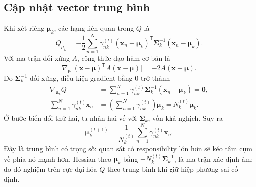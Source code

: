 \subsection{Cập nhật vector trung bình}
Khi xét riêng $\boldsymbol{\mu}_k$, các hạng liên quan trong $Q$ là
\begin{equation}
Q_{\mu_k}=-\frac12\sum_{n=1}^N\gamma_{nk}^{(t)}
(\mathbf{x}_n-\boldsymbol{\mu}_k)^{\mathsf T}\boldsymbol{\Sigma}_k^{-1}(\mathbf{x}_n-\boldsymbol{\mu}_k).
\end{equation}
Với ma trận đối xứng $A$, công thức đạo hàm cơ bản là
\begin{equation}
\nabla_{\boldsymbol{\mu}}\big[(\mathbf{x}-\boldsymbol{\mu})^{\mathsf T}A(\mathbf{x}-\boldsymbol{\mu})\big]
=-2A(\mathbf{x}-\boldsymbol{\mu}).
\end{equation}
Do $\boldsymbol{\Sigma}_k^{-1}$ đối xứng, điều kiện gradient bằng $0$ trở thành
\begin{align}
\nabla_{\boldsymbol{\mu}_k}Q
&=\sum_{n=1}^N\gamma_{nk}^{(t)}\boldsymbol{\Sigma}_k^{-1}(\mathbf{x}_n-\boldsymbol{\mu}_k)=\mathbf{0},\\
\sum_{n=1}^N\gamma_{nk}^{(t)}\mathbf{x}_n
&=\left(\sum_{n=1}^N\gamma_{nk}^{(t)}\right)\boldsymbol{\mu}_k
=N_k^{(t)}\boldsymbol{\mu}_k.
\end{align}
Ở bước biến đổi thứ hai, ta nhân hai vế với $\boldsymbol{\Sigma}_k$, vốn khả nghịch. Suy ra
\begin{equation}
\boxed{\boldsymbol{\mu}_k^{(t+1)}
=\frac{1}{N_k^{(t)}}\sum_{n=1}^N\gamma_{nk}^{(t)}\mathbf{x}_n.}
\label{eq:mstep-mu}
\end{equation}
Đây là trung bình có trọng số: quan sát có responsibility lớn hơn sẽ kéo tâm cụm về phía nó mạnh hơn. Hessian theo $\boldsymbol{\mu}_k$ bằng $-N_k^{(t)}\boldsymbol{\Sigma}_k^{-1}$, là ma trận xác định âm; do đó nghiệm trên cực đại hóa $Q$ theo trung bình khi giữ hiệp phương sai cố định.

